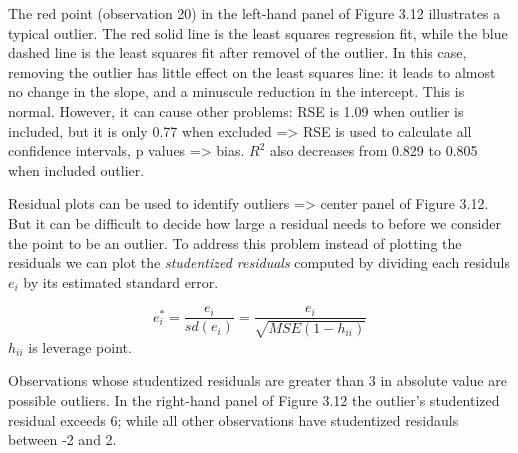 \documentclass[
  letterpaper,
  DIV=11,
  numbers=noendperiod]{scrreprt}
\begin{document}
The red point (observation 20) in the left-hand panel of Figure 3.12
illustrates a typical outlier. The red solid line is the least squares
regression fit, while the blue dashed line is the least squares fit
after removel of the outlier. In this case, removing the outlier has
little effect on the least squares line: it leads to almost no change in
the slope, and a minuscule reduction in the intercept. This is normal.
However, it can cause other problems: RSE is 1.09 when outlier is
included, but it is only 0.77 when excluded =\textgreater{} RSE is used
to calculate all confidence intervals, p values =\textgreater{} bias.
\(R^2\) also decreases from 0.829 to 0.805 when included outlier.

Residual plots can be used to identify outliers =\textgreater{} center
panel of Figure 3.12. But it can be difficult to decide how large a
residual needs to before we consider the point to be an outlier. To
address this problem instead of plotting the residuals we can plot the
\emph{studentized residuals} computed by dividing each residuls \(e_i\)
by its estimated standard error.

\[
e_i^*=\frac{e_i}{sd(e_i)} = \frac{e_i}{\sqrt{MSE(1-h_{ii})}}
\] \(h_{ii}\) is leverage point.

Observations whose studentized residuals are greater than 3 in absolute
value are possible outliers. In the right-hand panel of Figure 3.12 the
outlier's studentized residual exceeds 6; while all other observations
have studentized residauls between -2 and 2.
\end{document}

